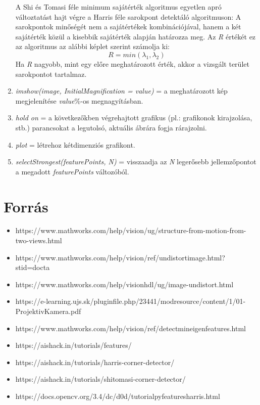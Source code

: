 \documentclass[12pt]{report}
\begin{document}
\begin{enumerate}
                    A Shi és Tomasi féle minimum sajátérték algoritmus egyetlen apró változtatást hajt végre a Harris féle sarokpont detektáló algoritmuson: A sarokpontok minőségét nem a sajátértékek kombinációjával, hanem a két sajátérték közül a kisebbik sajátérték alapján határozza meg. Az \textit{R} értékét ez az algoritmus az alábbi képlet szerint számolja ki:
                    \[R = min(\lambda_1, \lambda_2)\]
                    Ha \textit{R} nagyobb, mint egy előre meghatározott érték, akkor a vizsgált terület sarokpontot tartalmaz.
                    \item \textit{imshow(image, InitialMagnification = value)} = a meghatározott kép megjelenítése \textit{value}\%-os megnagyításban.
                    \item \textit{hold on} = a következőkben végrehajtott grafikus (pl.: grafikonok kirajzolása, stb.) parancsokat a legutolsó, aktuális ábrára fogja rárajzolni.
                    \item \textit{plot} = létrehoz kétdimenziós grafikont.
                    \item \textit{selectStrongest(featurePoints, N)} = visszaadja az \textit{N} legerősebb jellemzőpontot a megadott \textit{featurePoints} változóból.
                \end{enumerate}

    \chapter{Forrás}
        \begin{itemize}
            \item https://www.mathworks.com/help/vision/ug/structure-from-motion-from-two-views.html
            \item https://www.mathworks.com/help/vision/ref/undistortimage.html?s\textunderscore tid=doc\textunderscore ta
            \item https://www.mathworks.com/help/visionhdl/ug/image-undistort.html
            \item https://e-learning.ujs.sk/pluginfile.php/23441/mod\textunderscore resource/content/1/01-ProjektivKamera.pdf
            \item https://www.mathworks.com/help/vision/ref/detectmineigenfeatures.html
            \item https://aishack.in/tutorials/features/
            \item https://aishack.in/tutorials/harris-corner-detector/
            \item https://aishack.in/tutorials/shitomasi-corner-detector/
            \item https://docs.opencv.org/3.4/dc/d0d/tutorial\textunderscore py\textunderscore features\textunderscore harris.html
        \end{itemize}
\end{document}
